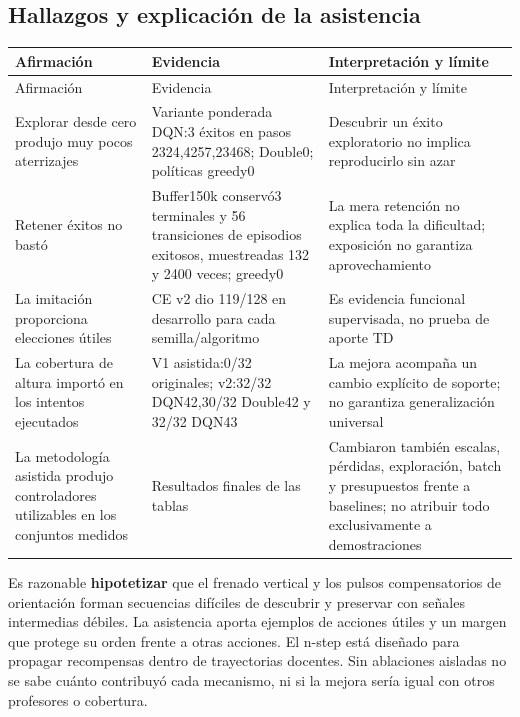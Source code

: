 \documentclass[12pt,a4paper]{article}
\begin{document}
\subsection{Hallazgos y explicación de la asistencia}
\begingroup
\setlength{\tabcolsep}{3pt}
\renewcommand{\arraystretch}{1.35}
\fontsize{9.1}{11.8}\selectfont
\begin{longtable}{>{\raggedright\arraybackslash}p{0.3200\dimexpr\linewidth-18pt\relax}>{\raggedright\arraybackslash}p{0.3400\dimexpr\linewidth-18pt\relax}>{\raggedright\arraybackslash}p{0.3400\dimexpr\linewidth-18pt\relax}}
\toprule
\rowcolor{Pale}Afirmación & Evidencia & Interpretación y límite \\
\midrule
\endfirsthead
\toprule
\rowcolor{Pale}Afirmación & Evidencia & Interpretación y límite \\
\midrule
\endhead
\bottomrule\endfoot
Explorar desde cero produjo muy pocos aterrizajes & Variante ponderada DQN:3 éxitos en pasos 2324,\allowbreak{}4257,\allowbreak{}23468; Double0; políticas greedy0 & Descubrir un éxito exploratorio no implica reproducirlo sin azar \\
Retener éxitos no bastó & Buffer150k conservó3 terminales y 56 transiciones de episodios exitosos,\allowbreak{} muestreadas 132 y 2400 veces; greedy0 & La mera retención no explica toda la dificultad; exposición no garantiza aprovechamiento \\
La imitación proporciona elecciones útiles & CE v2 dio 119/\allowbreak{}128 en desarrollo para cada semilla/\allowbreak{}algoritmo & Es evidencia funcional supervisada,\allowbreak{} no prueba de aporte TD \\
La cobertura de altura importó en los intentos ejecutados & V1 asistida:0/\allowbreak{}32 originales; v2:32/\allowbreak{}32 DQN42,\allowbreak{}30/\allowbreak{}32 Double42 y 32/\allowbreak{}32 DQN43 & La mejora acompaña un cambio explícito de soporte; no garantiza generalización universal \\
La metodología asistida produjo controladores utilizables en los conjuntos medidos & Resultados finales de las tablas & Cambiaron también escalas,\allowbreak{} pérdidas,\allowbreak{} exploración,\allowbreak{} batch y presupuestos frente a baselines; no atribuir todo exclusivamente a demostraciones \\
\end{longtable}
\endgroup
Es razonable \textbf{hipotetizar} que el frenado vertical y los pulsos compensatorios de orientación forman secuencias difíciles de descubrir y preservar con señales intermedias débiles. La asistencia aporta ejemplos de acciones útiles y un margen que protege su orden frente a otras acciones. El n-step está diseñado para propagar recompensas dentro de trayectorias docentes. Sin ablaciones aisladas no se sabe cuánto contribuyó cada mecanismo,\allowbreak{} ni si la mejora sería igual con otros profesores o cobertura.
\end{document}
